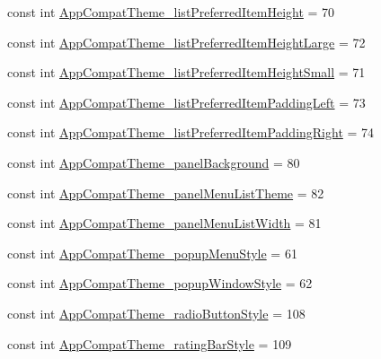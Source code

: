 \begin{DoxyCompactItemize}
\item 
const int \mbox{\hyperlink{class_f_w_p_s___app_1_1_droid_1_1_resource_1_1_styleable_ae724181180e2feed10c2fb855dae4a3d}{App\+Compat\+Theme\+\_\+list\+Preferred\+Item\+Height}} = 70
\item 
const int \mbox{\hyperlink{class_f_w_p_s___app_1_1_droid_1_1_resource_1_1_styleable_a8c39adf75c3b1f14dc9f13fbf8317874}{App\+Compat\+Theme\+\_\+list\+Preferred\+Item\+Height\+Large}} = 72
\item 
const int \mbox{\hyperlink{class_f_w_p_s___app_1_1_droid_1_1_resource_1_1_styleable_a6da97271a9a1dae1395709b5ee81ef3b}{App\+Compat\+Theme\+\_\+list\+Preferred\+Item\+Height\+Small}} = 71
\item 
const int \mbox{\hyperlink{class_f_w_p_s___app_1_1_droid_1_1_resource_1_1_styleable_a2c9571d79e4575786b0ed622adc998b5}{App\+Compat\+Theme\+\_\+list\+Preferred\+Item\+Padding\+Left}} = 73
\item 
const int \mbox{\hyperlink{class_f_w_p_s___app_1_1_droid_1_1_resource_1_1_styleable_a1c877a03f520914e3785955947b1c7e2}{App\+Compat\+Theme\+\_\+list\+Preferred\+Item\+Padding\+Right}} = 74
\item 
const int \mbox{\hyperlink{class_f_w_p_s___app_1_1_droid_1_1_resource_1_1_styleable_a52b03d2c150d45ffddfc24e9749ce0f1}{App\+Compat\+Theme\+\_\+panel\+Background}} = 80
\item 
const int \mbox{\hyperlink{class_f_w_p_s___app_1_1_droid_1_1_resource_1_1_styleable_a7f5aeb965bd0b631fe1b45fb95a69a83}{App\+Compat\+Theme\+\_\+panel\+Menu\+List\+Theme}} = 82
\item 
const int \mbox{\hyperlink{class_f_w_p_s___app_1_1_droid_1_1_resource_1_1_styleable_a96ab7385bd263f50afdd3ab2a04373d1}{App\+Compat\+Theme\+\_\+panel\+Menu\+List\+Width}} = 81
\item 
const int \mbox{\hyperlink{class_f_w_p_s___app_1_1_droid_1_1_resource_1_1_styleable_a31c4228efb6dc5e587225fcbff164d8c}{App\+Compat\+Theme\+\_\+popup\+Menu\+Style}} = 61
\item 
const int \mbox{\hyperlink{class_f_w_p_s___app_1_1_droid_1_1_resource_1_1_styleable_afbc91ee0396b1465acfd1a0a782a4547}{App\+Compat\+Theme\+\_\+popup\+Window\+Style}} = 62
\item 
const int \mbox{\hyperlink{class_f_w_p_s___app_1_1_droid_1_1_resource_1_1_styleable_a28eb45178d5b86a8db457b6c138c538c}{App\+Compat\+Theme\+\_\+radio\+Button\+Style}} = 108
\item 
const int \mbox{\hyperlink{class_f_w_p_s___app_1_1_droid_1_1_resource_1_1_styleable_adbdfac20179d610c8bb673e81957bdc4}{App\+Compat\+Theme\+\_\+rating\+Bar\+Style}} = 109

\end{DoxyCompactItemize}
